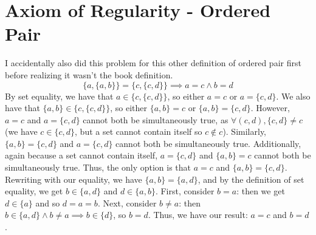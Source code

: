 \documentclass[12pt]{article}
\theoremstyle{definition}
\begin{document}
\newpage{}
\section{Axiom of Regularity - Ordered Pair}
I accidentally also did this problem for this other definition of ordered pair first before realizing it wasn't the book definition.
\[\{a,\{a,b\}\}=\{c,\{c,d\}\}\implies a=c\land b=d\]
By set equality, we have that $a\in \{c,\{c,d\}\}$, so either $a=c$ or $a=\{c,d\}$. We also have that $\{a,b\}\in \{c,\{c,d\}\}$, so either $\{a,b\}=c$ or $\{a,b\}=\{c,d\}$. However, $a=c$ and $a=\{c,d\}$ cannot both be simultaneously true, as $\forall(c,d),\{c,d\}\ne c$ (we have $c\in \{c,d\}$, but a set cannot contain itself so $c\not\in c$). Similarly, $\{a,b\}=\{c,d\}$ and $a=\{c,d\}$ cannot both be simultaneously true. Additionally, again because a set cannot contain itself, $a=\{c,d\}$ and $\{a,b\}=c$ cannot both be simultaneously true. Thus, the only option is that $a=c$ and $\{a,b\}=\{c,d\}$. Rewriting with our equality, we have $\{a,b\}=\{a,d\}$, and by the definition of set equality, we get $b\in \{a,d\}$ and $d\in\{a,b\}$. First, consider $b=a$: then we get $d\in \{a\}$ and so $d=a=b$. Next, consider $b\ne a$: then $b\in\{a,d\}\land b\ne a\implies b\in\{d\}$, so $b=d$. Thus, we have our result: $a=c$ and $b=d$.
\end{document}
